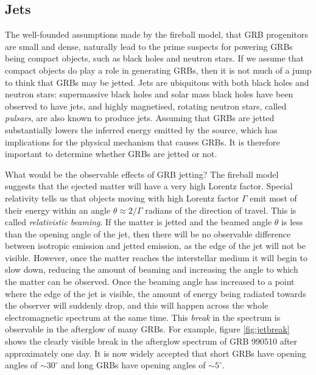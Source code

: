\documentclass[11pt]{cuthesis}
\begin{document}
\subsection{Jets} \label{sec:jets}
The well-founded assumptions made by the fireball model, that GRB progenitors are small and dense, naturally lead to the prime suspects for powering GRBs being compact objects, such as black holes and neutron stars. If we assume that compact objects do play a role in generating GRBs, then it is not much of a jump to think that GRBs may be jetted. Jets are ubiquitous with both black holes and neutron stars: supermassive black holes and solar mass black holes have been observed to have jets, and highly magnetised, rotating neutron stars, called \textit{pulsars}, are also known to produce jets. Assuming that GRBs are jetted substantially lowers the inferred energy emitted by the source, which has implications for the physical mechanism that causes GRBs. It is therefore important to determine whether GRBs are jetted or not. 

What would be the observable effects of GRB jetting? The fireball model suggests that the ejected matter will have a very high Lorentz factor. Special relativity tells us that objects moving with high Lorentz factor $\Gamma$ emit most of their energy within an angle $\theta\approx 2/\Gamma$ radians of the direction of travel. This is called \textit{relativistic beaming}. If the matter is jetted and the beamed angle $\theta$ is less than the opening angle of the jet, then there will be no observable difference between isotropic emission and jetted emission, as the edge of the jet will not be visible. However, once the matter reaches the interstellar medium it will begin to slow down, reducing the amount of beaming and increasing the angle to which the matter can be observed. Once the beaming angle has increased to a point where the edge of the jet is visible, the amount of energy being radiated towards the observer will suddenly drop, and this will happen across the whole electromagnetic spectrum at the same time. This \textit{break} in the spectrum is observable in the afterglow of many GRBs. For example, figure \ref{fig:jetbreak} shows the clearly visible break in the afterglow spectrum of GRB 990510 after approximately one day. It is now widely accepted that short GRBs have opening angles of $\sim30^\circ$\cite{GW170817_GRB} and long GRBs have opening angles of $\sim5^\circ$\cite{long_jet_angle}.
\end{document}

